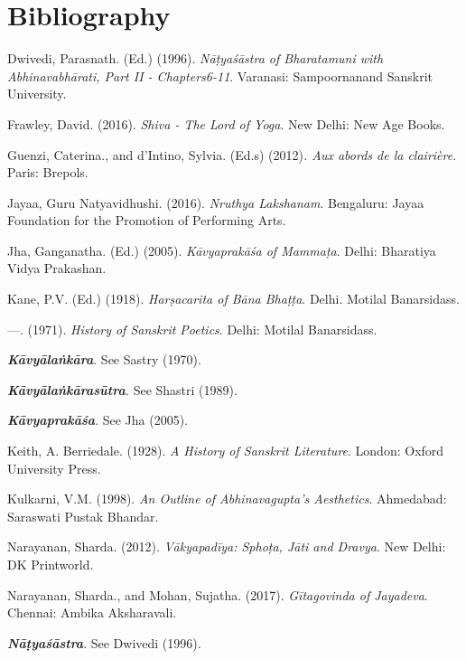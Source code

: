 \section*{Bibliography}

\begin{thebibliography}{99}
\itemsep=0pt
 Dwivedi, Parasnath. (Ed.) (1996). \textit{Nāṭyaśāstra of Bharatamuni with Abhinavabhārati, Part II - Chapters6-11}. Varanasi: Sampoornanand Sanskrit University.

  Frawley, David. (2016). \textit{Shiva - The Lord of Yoga}. New Delhi: New Age Books.

  Guenzi, Caterina., and d’Intino, Sylvia. (Ed.s) (2012)\textit{. Aux abords de la clairière}. Paris: Brepols.

  Jayaa, Guru Natyavidhushi. (2016). \textit{Nruthya Lakshanam}. Bengaluru: Jayaa Foundation for the Promotion of Performing Arts.

  Jha, Ganganatha. (Ed.) (2005). \textit{Kāvyaprakāśa of Mammaṭa}. Delhi: Bharatiya Vidya Prakashan.

  Kane, P.V. (Ed.) (1918). \textit{Harṣacarita of Bāna Bhaṭṭa}. Delhi. Motilal Banarsidass.

  —. (1971). \textit{History of Sanskrit Poetics}. Delhi: Motilal Banarsidass.

  \textit{\textbf{Kāvyālaṅkāra}}. See Sastry (1970).

  \textit{\textbf{Kāvyālaṅkārasūtra}. }See Shastri (1989).

  \textit{\textbf{Kāvyaprakāśa}}. See Jha (2005).

  Keith, A. Berriedale. (1928). \textit{A History of Sanskrit Literature}. London: Oxford University Press.

  Kulkarni, V.M. (1998). \textit{An Outline of Abhinavagupta’s Aesthetics}. Ahmedabad: Saraswati Pustak Bhandar.

  Narayanan, Sharda. (2012). \textit{Vākyapadīya: Sphoṭa, Jāti and Dravya}. New Delhi: DK Printworld.

  Narayanan, Sharda., and Mohan, Sujatha. (2017).\textit{ Gītagovinda of Jayadeva}. Chennai: Ambika Aksharavali.

  \textit{\textbf{Nāṭyaśāstra}}. See Dwivedi (1996).


\end{thebibliography}
